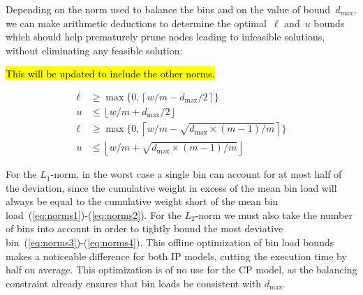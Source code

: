 \documentclass{llncs}
\begin{document}
Depending on the norm used to balance the bins and on the value of bound~$d_{\max}$, we can make arithmetic deductions to determine the optimal~$\ell$ and~$u$ bounds which should help prematurely prune nodes leading to infeasible solutions, without eliminating any feasible solution:

\hl{This will be updated to include the other norms.}

\begin{align}
  \ell & \geq \max\{0, \left\lceil w/m - d_{\max}/2 \right\rceil \} \label{eq:norms1} \\
  u & \leq \left\lfloor w/m + d_{\max}/2 \right\rfloor \label{eq:norms2} \\
  \ell & \geq \max\{0, \left\lceil w/m - \sqrt{d_{\max} \times (m-1)/m} \right\rceil \} \label{eq:norms3} \\
  u & \leq \left\lfloor w/m + \sqrt{d_{\max} \times (m-1)/m} \right\rfloor \label{eq:norms4}
\end{align}


For the $L_{1}$-norm, in the worst case a single bin can account for at most half of the deviation, since the cumulative weight in excess of the mean bin load will always be equal to the cumulative weight short of the mean bin load~(\ref{eq:norms1})-(\ref{eq:norms2}). For the $L_{2}$-norm we must also take the number of bins into account in order to tightly bound the most deviative bin~(\ref{eq:norms3})-(\ref{eq:norms4}). This offline optimization of bin load bounds makes a noticeable difference for both IP models, cutting the execution time by half on average. This optimization is of no use for the CP model, as the balancing constraint already ensures that bin loads be consistent with $d_{\max}$.

\end{document}
